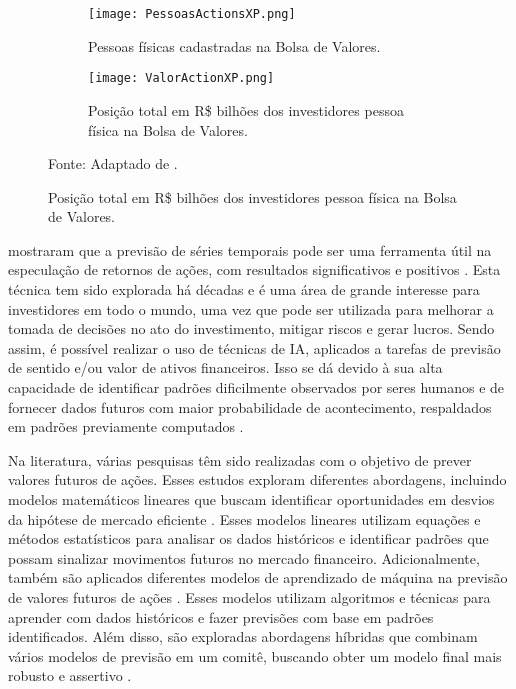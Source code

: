 \begin{figure}
     \centering
     \caption{Dados da bolsa de valores brasileira.}
     \begin{subfigure}[b]{0.48\textwidth}
         \centering
         \texttt{[image: PessoasActionsXP.png]}
         \caption{Pessoas físicas cadastradas na Bolsa de Valores.}
         \label{fig:PessoasActionsXP} 
     \end{subfigure}
     \hfill
     \begin{subfigure}[b]{0.48\textwidth}
         \centering
         \texttt{[image: ValorActionXP.png]}
         \caption{Posição total em R\$ bilhões dos investidores pessoa física na Bolsa de Valores.}
         \label{fig:ValorActionXP}
     \end{subfigure}

     Fonte: Adaptado de .
\end{figure}

 mostraram que a previsão de séries temporais pode ser uma ferramenta útil na especulação de retornos de ações, com resultados significativos e positivos \cite{Gonzalo_Estimation2}. Esta técnica tem sido explorada há décadas e é uma área de grande interesse para investidores em todo o mundo, uma vez que pode ser utilizada para melhorar a tomada de decisões no ato do investimento, mitigar riscos e gerar lucros. Sendo assim, é possível realizar o uso de técnicas de \ac{IA}, aplicados a tarefas de previsão de sentido e/ou valor de ativos financeiros. Isso se dá devido à sua alta capacidade de identificar padrões dificilmente observados por seres humanos e de fornecer dados futuros com maior probabilidade de acontecimento, respaldados em padrões previamente computados \cite{Jerzy_Deep}.

Na literatura, várias pesquisas têm sido realizadas com o objetivo de prever valores futuros de ações. Esses estudos exploram diferentes abordagens, incluindo modelos matemáticos lineares que buscam identificar oportunidades em desvios da hipótese de mercado eficiente \cite{Charlene}. Esses modelos lineares utilizam equações e métodos estatísticos para analisar os dados históricos e identificar padrões que possam sinalizar movimentos futuros no mercado financeiro.
Adicionalmente, também são aplicados diferentes modelos de aprendizado de máquina na previsão de valores futuros de ações \cite{Leonardo_Comparative, Ciniro_Econometric}. Esses modelos utilizam algoritmos e técnicas para aprender com dados históricos e fazer previsões com base em padrões identificados.
Além disso, são exploradas abordagens híbridas que combinam vários modelos de previsão em um comitê, buscando obter um modelo final mais robusto e assertivo \cite{Jerzy_Deep}. 

